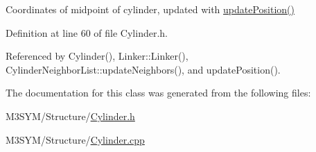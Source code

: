 Coordinates of midpoint of cylinder, updated with \hyperlink{classCylinder_aff701d6f4400ab216431d627c54a0b4e}{update\+Position()} 



Definition at line 60 of file Cylinder.\+h.



Referenced by Cylinder(), Linker\+::\+Linker(), Cylinder\+Neighbor\+List\+::update\+Neighbors(), and update\+Position().



The documentation for this class was generated from the following files\+:\begin{DoxyCompactItemize}
\item 
M3\+S\+Y\+M/\+Structure/\hyperlink{Cylinder_8h}{Cylinder.\+h}\item 
M3\+S\+Y\+M/\+Structure/\hyperlink{Cylinder_8cpp}{Cylinder.\+cpp}\end{DoxyCompactItemize}

